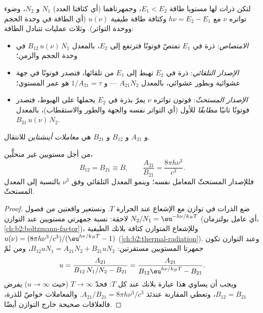 \begin{definition}\label{def:b2:laser:processes}
لتكن ذرات لها مستويا طاقة $E_1 < E_2$، وجمهرتاهما (أي كثافتا
العدد) $N_1$ و $N_2$، وضوء تواتره $\nu$ مع
$h\nu = E_2 - E_1$ وكثافة طاقة طيفية $u(\nu)$ (أي الطاقة في وحدة
الحجم ووحدة التواتر). وثلاث عمليات تتبادل الطاقة:
\begin{itemize}
\item \emph{الامتصاص}: ذرة في
      $E_1$ تمتصّ فوتونًا فترتفع إلى $E_2$، بالمعدل
      $B_{12}\,u(\nu)\,N_1$ في وحدة الحجم والزمن؛
\item \emph{الإصدار التلقائي}: ذرة
      في $E_2$ تهبط إلى $E_1$ من تلقائها، فتصدر فوتونًا في جهة
      عشوائية وبطور عشوائي، بالمعدل $A_{21}N_2$ ---
      و $1/A_{21} = \tau$ هو عمر المستوي؛
\item \emph{الإصدار المستحثّ}: فوتون
      تواتره $\nu$ يمرّ بذرة في $E_2$ يحملها على الهبوط،
      فتصدر فوتونًا ثانيًا \emph{مطابقًا} للأول (أي التواتر
      نفسه والجهة والطور والاستقطاب)، بالمعدل
      $B_{21}\,u(\nu)\,N_2$.
\end{itemize}
و $A_{21}$ و $B_{12}$ و $B_{21}$ هي \emph{معاملات
أينشتاين} للانتقال.
\end{definition}

\begin{proposition}\label{prop:b2:laser:einstein}
من أجل مستويين غير منحلَّين،
\[
B_{12} = B_{21} \equiv B, \qquad
\frac{A_{21}}{B_{21}} = \frac{8\pi h\nu^3}{c^3}.
\]
فللإصدار المستحثّ  المعامل نفسه؛ وينمو
المعدل التلقائي وفق $\nu^3$ بالنسبة إلى المعدل المستحثّ.
\end{proposition}

\begin{proof}
ضع الذرات في توازن مع الإشعاع عند الحرارة $T$. ونستعير
واقعتين من فصول لاحقة: نسبة جمهرتي
مستويين عند التوازن $N_2/N_1 = \eu^{-h\nu/k_BT}$ (أي
عامل بولتزمان، \cref{ch:b2:boltzmann-factor})، وللإشعاع
المتوازن كثافة بلانك الطيفية
$u(\nu) = (8\pi h\nu^3/c^3)/(\eu^{h\nu/k_BT} - 1)$
(\cref{ch:b2:thermal-radiation}). وعند التوازن تكون جمهرتا المستويين
مستقرتين: $B_{12}uN_1 = A_{21}N_2 + B_{21}uN_2$، ومن ثَمّ
\[
u = \frac{A_{21}}{B_{12}\,N_1/N_2 - B_{21}}
  = \frac{A_{21}}{B_{12}\eu^{h\nu/k_BT} - B_{21}}.
\]
ويجب أن يساوي هذا عبارة بلانك عند كل $T$: فحدّ $T \to \infty$
(حيث $u \to \infty$) يفرض $B_{12} = B_{21}$، وتعطي
المقارنة عندئذ $A_{21}/B_{21} = 8\pi h\nu^3/c^3$. والمعاملات
خواصّ للذرة، فالعلاقات صحيحة خارج
التوازن أيضًا.
\end{proof}

